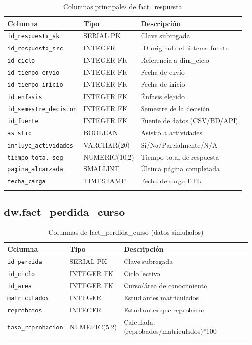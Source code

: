 \documentclass[12pt, letterpaper]{article}
\begin{document}
\begin{longtable}{llp{6cm}}
\toprule
\textbf{Columna} & \textbf{Tipo} & \textbf{Descripción} \\
\midrule
\endhead
\texttt{id\_respuesta\_sk} & SERIAL PK & Clave subrogada \\
\texttt{id\_respuesta\_src} & INTEGER & ID original del sistema fuente \\
\texttt{id\_ciclo} & INTEGER FK & Referencia a dim\_ciclo \\
\texttt{id\_tiempo\_envio} & INTEGER FK & Fecha de envío \\
\texttt{id\_tiempo\_inicio} & INTEGER FK & Fecha de inicio \\
\texttt{id\_enfasis} & INTEGER FK & Énfasis elegido \\
\texttt{id\_semestre\_decision} & INTEGER FK & Semestre de la decisión \\
\texttt{id\_fuente} & INTEGER FK & Fuente de datos (CSV/BD/API) \\
\texttt{asistio} & BOOLEAN & Asistió a actividades \\
\texttt{influyo\_actividades} & VARCHAR(20) & Sí/No/Parcialmente/N/A \\
\texttt{tiempo\_total\_seg} & NUMERIC(10,2) & Tiempo total de respuesta \\
\texttt{pagina\_alcanzada} & SMALLINT & Última página completada \\
\texttt{fecha\_carga} & TIMESTAMP & Fecha de carga ETL \\
\bottomrule
\caption{Columnas principales de fact\_respuesta}
\end{longtable}

\subsection{dw.fact\_perdida\_curso}

\begin{longtable}{llp{6cm}}
\toprule
\textbf{Columna} & \textbf{Tipo} & \textbf{Descripción} \\
\midrule
\endhead
\texttt{id\_perdida} & SERIAL PK & Clave subrogada \\
\texttt{id\_ciclo} & INTEGER FK & Ciclo lectivo \\
\texttt{id\_area} & INTEGER FK & Curso/área de conocimiento \\
\texttt{matriculados} & INTEGER & Estudiantes matriculados \\
\texttt{reprobados} & INTEGER & Estudiantes que reprobaron \\
\texttt{tasa\_reprobacion} & NUMERIC(5,2) & Calculada: (reprobados/matriculados)*100 \\
\bottomrule
\caption{Columnas de fact\_perdida\_curso (datos simulados)}
\end{longtable}
\end{document}
